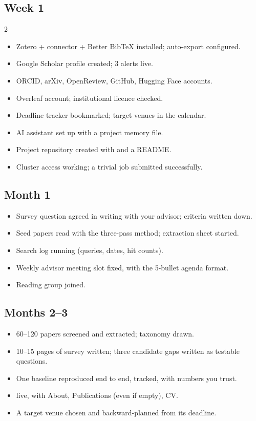 \documentclass[11pt,a4paper]{article}
\begin{document}
\subsection*{Week 1}
\begin{multicols}{2}
\begin{itemize}
  \item Zotero + connector + Better BibTeX installed; auto-export configured.
  \item Google Scholar profile created; 3 alerts live.
  \item ORCID, arXiv, OpenReview, GitHub, Hugging Face accounts.
  \item Overleaf account; institutional licence checked.
  \item Deadline tracker bookmarked; target venues in the calendar.
  \item AI assistant set up with a project memory file.
  \item Project repository created with  and a README.
  \item Cluster access working; a trivial job submitted successfully.
\end{itemize}
\end{multicols}

\subsection*{Month 1}
\begin{itemize}
  \item Survey question agreed in writing with your advisor; criteria written
        down.
  \item Seed papers read with the three-pass method; extraction sheet started.
  \item Search log running (queries, dates, hit counts).
  \item Weekly advisor meeting slot fixed, with the 5-bullet agenda format.
  \item Reading group joined.
\end{itemize}

\subsection*{Months 2--3}
\begin{itemize}
  \item 60--120 papers screened and extracted; taxonomy drawn.
  \item 10--15 pages of survey written; three candidate gaps written as
        testable questions.
  \item One baseline reproduced end to end, tracked, with numbers you trust.
  \item {} live, with About, Publications (even if
        empty), CV.
  \item A target venue chosen and backward-planned from its deadline.
\end{itemize}
\end{document}
